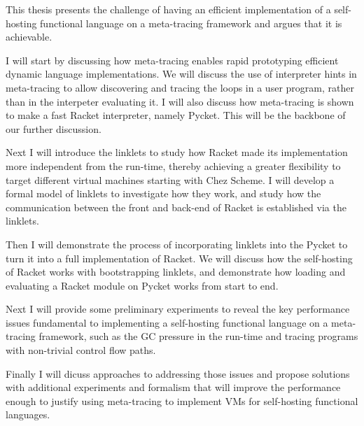 This thesis presents the challenge of having an efficient
implementation of a self-hosting functional language on a meta-tracing
framework and argues that it is achievable.

I will start by discussing how meta-tracing enables rapid prototyping
efficient dynamic language implementations. We will discuss the use of
interpreter hints in meta-tracing to allow discovering and tracing the
loops in a user program, rather than in the interpeter evaluating
it. I will also discuss how meta-tracing is shown to make a fast
Racket interpreter, namely Pycket. This will be the backbone of our
further discussion.

Next I will introduce the linklets to study how Racket made its
implementation more independent from the run-time, thereby achieving a
greater flexibility to target different virtual machines starting with
Chez Scheme. I will develop a formal model of linklets to investigate
how they work, and study how the communication between the front and
back-end of Racket is established via the linklets.

Then I will demonstrate the process of incorporating linklets into the
Pycket to turn it into a full implementation of Racket. We will
discuss how the self-hosting of Racket works with bootstrapping
linklets, and demonstrate how loading and evaluating a Racket module
on Pycket works from start to end.

Next I will provide some preliminary experiments to reveal the key
performance issues fundamental to implementing a self-hosting
functional language on a meta-tracing framework, such as the GC
pressure in the run-time and tracing programs with non-trivial control
flow paths.

Finally I will dicuss approaches to addressing those issues and
propose solutions with additional experiments and formalism that will
improve the performance enough to justify using meta-tracing to
implement VMs for self-hosting functional languages.
